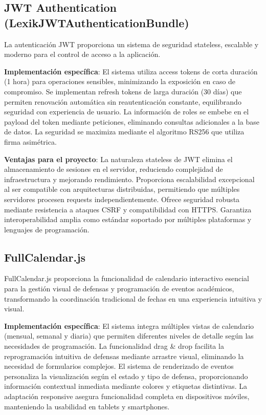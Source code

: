 \documentclass[12pt,a4paper,oneside]{report}
\begin{document}
\subsection{JWT Authentication
(LexikJWTAuthenticationBundle)}\label{jwt-authentication-lexikjwtauthenticationbundle}

La autenticación JWT proporciona un sistema de seguridad stateless,
escalable y moderno para el control de acceso a la aplicación.

\textbf{Implementación específica}: El sistema utiliza access tokens de corta duración (1 hora) para operaciones sensibles, minimizando la exposición en caso de compromiso. Se implementan refresh tokens de larga duración (30 días) que permiten renovación automática sin reautenticación constante, equilibrando seguridad con experiencia de usuario. La información de roles se embebe en el payload del token mediante peticiones, eliminando consultas adicionales a la base de datos. La seguridad se maximiza mediante el algoritmo RS256 que utiliza firma asimétrica.

\textbf{Ventajas para el proyecto}: La naturaleza stateless de JWT elimina el almacenamiento de sesiones en el servidor, reduciendo complejidad de infraestructura y mejorando rendimiento. Proporciona escalabilidad excepcional al ser compatible con arquitecturas distribuidas, permitiendo que múltiples servidores procesen requests independientemente. Ofrece seguridad robusta mediante resistencia a ataques CSRF y compatibilidad con HTTPS. Garantiza interoperabilidad amplia como estándar soportado por múltiples plataformas y lenguajes de programación.

\subsection{FullCalendar.js}\label{fullcalendar.js}

FullCalendar.js proporciona la funcionalidad de calendario interactivo esencial para la gestión visual de defensas y programación de eventos académicos, transformando la coordinación tradicional de fechas en una experiencia intuitiva y visual.

\textbf{Implementación específica}: El sistema integra múltiples vistas de calendario (mensual, semanal y diaria) que permiten diferentes niveles de detalle según las necesidades de programación. La funcionalidad drag \& drop facilita la reprogramación intuitiva de defensas mediante arrastre visual, eliminando la necesidad de formularios complejos. El sistema de renderizado de eventos personaliza la visualización según el estado y tipo de defensa, proporcionando información contextual inmediata mediante colores y etiquetas distintivas. La adaptación responsive asegura funcionalidad completa en dispositivos móviles, manteniendo la usabilidad en tablets y smartphones.
\end{document}
